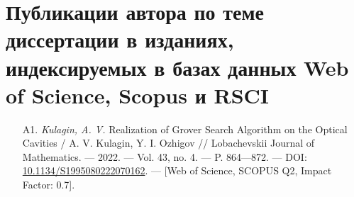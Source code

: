 \clearpage

\chapter*{
	Публикации автора по теме диссертации в изданиях, индексируемых в базах данных Web of Science, Scopus и RSCI
}
\vspace{-1em}
\hypersetup{urlcolor=blue}
{\seminormalsize
\begin{itemize}[leftmargin=24pt]
	\item[A1.]{\textit{Kulagin, A. V.} Realization of Grover Search Algorithm on the Opti­cal Cavities / A. V. Kulagin, Y. I. Ozhigov // Lobachevskii Journal of Mathematics. — 2022. — Vol. 43, no. 4. — P. 864—872. — DOI: \href{https://doi.org/10.1134/S1995080222070162}{10.1134/S1995080222070162}. — [Web of Science, SCOPUS Q2, Impact Factor: 0.7].}
\end{itemize}
}
